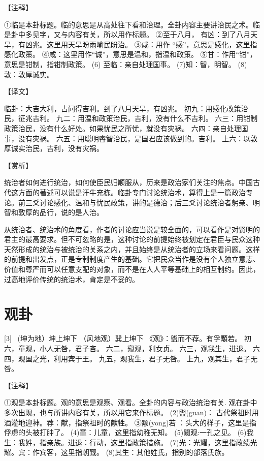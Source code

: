 \documentclass[12pt,UTF8]{ctexbook}
\begin{document}
【注释】

①临是本卦标题。临的意思是从高处往下看和治理。全卦内容主要讲治民之术。临是卦中多见字，又与内容有关，所以用作标题。
②至于八月， 有凶：到了八月天旱，有凶兆。这里用天旱盼雨喻民盼治。
③咸：用作 “感”，意思是感化，这里指感化政策。
④咸：这里用作“诚”，意思是温和，指温和政策。
⑤甘：作用“钳”，意思是钳制，指钳制政策。
(6) 至临：亲自处理国事。
(7)知：智，明智。
(8)敦：敦厚诚实。

【译文】

临卦：大吉大利，占问得吉利。到了八月天旱，有凶兆。
初九：用感化改策治民，征兆吉利。
九二：用温和政策治民，吉利，没有什么不吉利。
六三：用钳制政策治民，没有什么好处。如果忧民之所忧，就没有灾祸。
六四：亲自处理国事，没有灾祸。
六五：用聪明睿智治民，是国君应该做到的。吉利。
上六：以敦厚诚实治民，吉利，没有灾祸。

【赏析】

统治者如何进行统治，如何使臣民归顺服从，历来是政治家们关注的焦点。中国古代这方面的著述可以说是汗牛充栋。临卦专门讨论统治术，算得上是一篇政治专论。前三爻讨论感化、温和与忧民政策，讲的是德治；后三爻讨论统治者躬亲、明智和敦厚的品行，说的是人治。

从统治者、统治术的角度看，作者的讨论应当说是较全面的，可以看作是对贤明的君主的最高要求。但不可忽略的是，这种讨论的前提始终被划定在君臣与民众这种天然形成的统治与被统治的关系之内，并且始终是从统治者的立场来看问题。这样的前提和出发点，正是专制制度产生的基础。它把民众当作是没有个人独立意志、价值和尊严而可以任意支配的对象，而不是在人人平等基础上的相互制约。因此，过高地评价传统的统治术，肯定是不妥的。

\chapter{观卦}
[3] \ (坤为地）坤上坤下
（风地观）巽上坤下
《观》：盥而不荐。有孚顒若。
初六，童观，小人无咎，君子吝。
六二，窥观，利女贞。
六三，观我生，进退。
六四，观国之光，利用宾于王。
九五，观我生，君子无咎。
上九，观其生，君子无咎。

【注释】

①观是本卦标题。观的意思是观察、观看。全卦的内容与政治统治有关. 观在卦中多次出现，也与所讲内容有关，所以用它来作标题。
(2)盥(guan)： 古代祭祖时用酒灌地迎神。荐：献，指祭祖时的献牲。
③颙(yong)若 ：头大的样子，这里是指俘虏的头被打肿了。
(4)童：儿童，这里指幼稚无知。
(5)闚观:一孔之见。
(6)我生：我姓，指亲族。进退：行动，这里指政策措施。
(7)光：光耀，这里指政绩光耀。宾：作宾客，这里指朝觐。
(8)其生：其他姓氏，指别的部落氏族。
\end{document}
